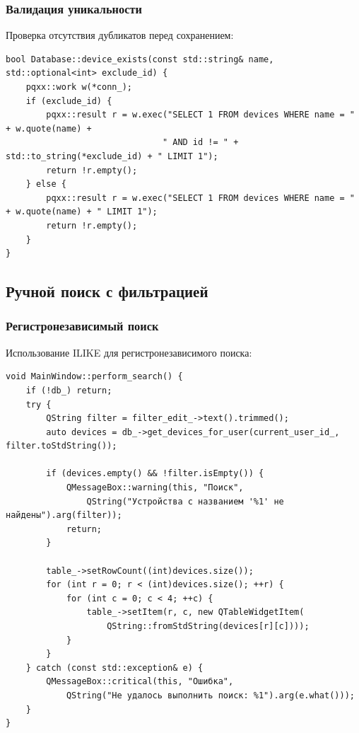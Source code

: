 \documentclass[oneside,a4paper,14pt]{extarticle}
\begin{document}
\subsubsection*{Валидация уникальности}
\noindent Проверка отсутствия дубликатов перед сохранением:

\begin{verbatim}
bool Database::device_exists(const std::string& name, std::optional<int> exclude_id) {
    pqxx::work w(*conn_);
    if (exclude_id) {
        pqxx::result r = w.exec("SELECT 1 FROM devices WHERE name = " + w.quote(name) +
                               " AND id != " + std::to_string(*exclude_id) + " LIMIT 1");
        return !r.empty();
    } else {
        pqxx::result r = w.exec("SELECT 1 FROM devices WHERE name = " + w.quote(name) + " LIMIT 1");
        return !r.empty();
    }
}
\end{verbatim}

\subsection*{Ручной поиск с фильтрацией}

\subsubsection*{Регистронезависимый поиск}
\noindent Использование ILIKE для регистронезависимого поиска:

\begin{verbatim}
void MainWindow::perform_search() {
    if (!db_) return;
    try {
        QString filter = filter_edit_->text().trimmed();
        auto devices = db_->get_devices_for_user(current_user_id_, filter.toStdString());

        if (devices.empty() && !filter.isEmpty()) {
            QMessageBox::warning(this, "Поиск",
                QString("Устройства с названием '%1' не найдены").arg(filter));
            return;
        }

        table_->setRowCount((int)devices.size());
        for (int r = 0; r < (int)devices.size(); ++r) {
            for (int c = 0; c < 4; ++c) {
                table_->setItem(r, c, new QTableWidgetItem(
                    QString::fromStdString(devices[r][c])));
            }
        }
    } catch (const std::exception& e) {
        QMessageBox::critical(this, "Ошибка",
            QString("Не удалось выполнить поиск: %1").arg(e.what()));
    }
}
\end{verbatim}
\end{document}
